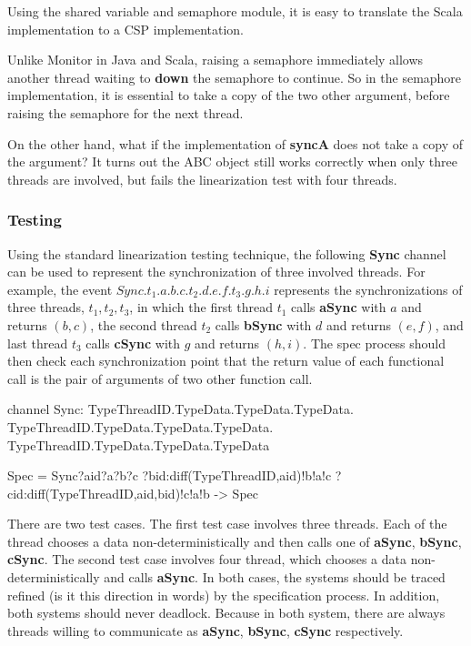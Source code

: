 \documentclass{article}
\begin{document}
Using the shared variable and semaphore module, it is easy to translate the Scala implementation to a CSP implementation. 

Unlike Monitor in Java and Scala, raising a semaphore immediately allows another thread waiting to \textbf{down} the semaphore to continue. So in the semaphore implementation, it is essential to take a copy of the two other argument, before raising the semaphore for the next thread. 

On the other hand, what if the implementation of \textbf{syncA} does not take a copy of the argument? It turns out the ABC object still works correctly when only three threads are involved, but fails the linearization test with four threads.

\subsubsection{Testing}
Using the standard linearization testing technique, the following \textbf{Sync} channel can be used to represent the synchronization of three involved threads. For example, the event $Sync.t_1.a.b.c.t_2.d.e.f.t_3.g.h.i$ represents the synchronizations of three threads, $t_1,t_2,t_3$, in which the first thread $t_1$ calls \textbf{aSync} with $a$ and returns $(b,c)$, the second thread $t_2$ calls \textbf{bSync} with $d$ and returns $(e,f)$, and last thread $t_3$ calls \textbf{cSync} with $g$ and returns $(h,i)$. The spec process should then check each synchronization point that the return value of each functional call is the pair of arguments of two other function call.

\begin{cspm}
channel Sync: TypeThreadID.TypeData.TypeData.TypeData.
              TypeThreadID.TypeData.TypeData.TypeData.
              TypeThreadID.TypeData.TypeData.TypeData

Spec = Sync?aid?a?b?c
           ?bid:diff(TypeThreadID,{aid})!b!a!c
           ?cid:diff(TypeThreadID,{aid,bid})!c!a!b 
    -> Spec
\end{cspm}

There are two test cases. The first test case involves three threads. Each of the thread chooses a data non-deterministically and then calls one of \textbf{aSync}, \textbf{bSync}, \textbf{cSync}. The second test case involves four thread, which chooses a data non-deterministically and calls \textbf{aSync}. In both cases, the systems should be traced refined (is it this direction in words) by the specification process. In addition, both systems should never deadlock. Because in both system, there are always threads willing to communicate as \textbf{aSync}, \textbf{bSync}, \textbf{cSync} respectively.
\end{document}
